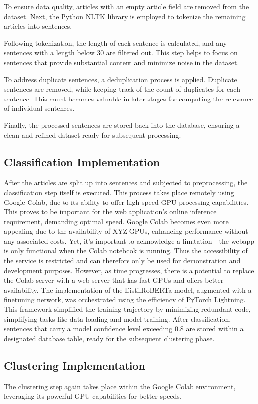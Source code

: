 \documentclass[a4paper,10pt]{report} %
\begin{document}
To ensure data quality, articles with an empty article field are removed from the dataset. Next, the Python NLTK library is employed to tokenize the remaining articles into sentences.

Following tokenization, the length of each sentence is calculated, and any sentences with a length below 30 are filtered out. This step helps to focus on sentences that provide substantial content and minimize noise in the dataset.

To address duplicate sentences, a deduplication process is applied. Duplicate sentences are removed, while keeping track of the count of duplicates for each sentence. This count becomes valuable in later stages for computing the relevance of individual sentences.

Finally, the processed sentences are stored back into the database, ensuring a clean and refined dataset ready for subsequent processing.

\subsection{Classification Implementation}
After the articles are split up into sentences and subjected to preprocessing, the classification step itself is executed. This process takes place remotely using Google Colab, due to its ability to offer high-speed GPU processing capabilities. This proves to be important for the web application's online inference requirement, demanding optimal speed.
Google Colab becomes even more appealing due to the availability of XYZ GPUs, enhancing performance without any associated costs. Yet, it's important to acknowledge a limitation - the webapp is only functional when the Colab notebook is running. Thus the accessibility of the service is restricted and can therefore only be used for demonstration and development purposes.
However, as time progresses, there is a potential to replace the Colab server with a web server that has fast GPUs and offers better availability.
The implementation of the DistilRoBERTa model, augmented with a finetuning network, was orchestrated using the efficiency of PyTorch Lightning. This framework simplified the training trajectory by minimizing redundant code, simplifying tasks like data loading and model training.
After classification, sentences that carry a model confidence level exceeding 0.8 are stored within a designated database table, ready for the subsequent clustering phase.

\subsection{Clustering Implementation}
The clustering step again takes place within the Google Colab environment, leveraging its powerful GPU capabilities for better speeds.
\end{document}
